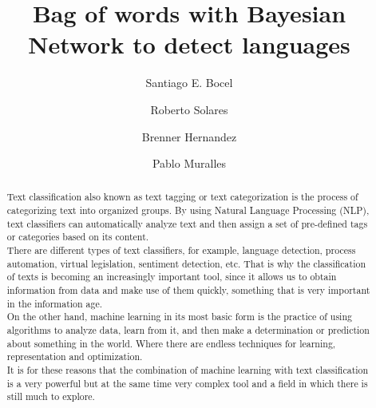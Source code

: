 \documentclass[sigconf,12pt,review=false,natbib=false]{acmart}
\begin{document}
\renewcommand\footnotetextcopyrightpermission[1]{}
\pagestyle{plain}

\title{Bag of words with Bayesian Network to detect languages}


\author{Santiago E. Bocel}

\author{Roberto Solares}

\author{Brenner Hernandez}

\author{Pablo Muralles}

\begin{abstract}

Text classification also known as text tagging or text categorization is the process of categorizing
text into organized groups. By using Natural Language Processing (NLP), text classifiers can
automatically analyze text and then assign a set of pre-defined tags or categories based on its
content. \\

There are different types of text classifiers, for example, language detection, process automation,
virtual legislation, sentiment detection, etc. That is why the classification of texts is becoming
an increasingly important tool, since it allows us to obtain information from data and make use of
them quickly, something that is very important in the information age. \\

On the other hand, machine learning in its most basic form is the practice of using algorithms to
analyze data, learn from it, and then make a determination or prediction about something in the
world. Where there are endless techniques for learning, representation and optimization. \\

It is for these reasons that the combination of machine learning with text classification is a very
powerful but at the same time very complex tool and a field in which there is still much to
explore. \\

\end{abstract}
\end{document}
